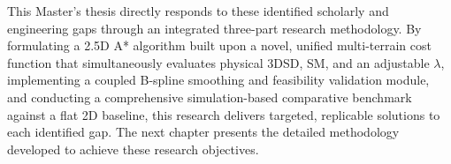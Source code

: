 This Master's thesis directly responds to these identified scholarly and engineering gaps through an
integrated three-part research methodology. By formulating a 2.5D A* algorithm built upon a novel,
unified multi-terrain cost function that simultaneously evaluates physical 3DSD, SM, and an
adjustable $\lambda$, implementing a coupled B-spline smoothing and feasibility validation module,
and conducting a comprehensive simulation-based comparative benchmark against a flat 2D baseline,
this research delivers targeted, replicable solutions to each identified gap. The next chapter
presents the detailed methodology developed to achieve these research objectives.
